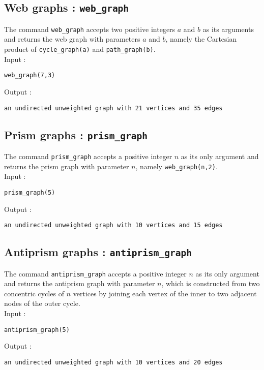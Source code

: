 \documentclass[a4paper,11pt]{article}
\begin{document}
\subsection{Web graphs : {\tt web\_graph}}

The command {\tt web\_graph} accepts two positive integers $ a $ and $ b $ as its arguments and returns the web graph with parameters $ a $ and $ b $, namely the Cartesian product of {\tt cycle\_graph(a)} and {\tt path\_graph(b)}.\\
Input :
\begin{center}
  \tt web\_graph(7,3)
\end{center}
Output :
\begin{center}
  \tt an undirected unweighted graph with 21 vertices and 35 edges
\end{center}

\subsection{Prism graphs : {\tt prism\_graph}}

The command {\tt prism\_graph} accepts a positive integer $ n $ as its only argument and returns the prism graph with parameter $ n $, namely {\tt web\_graph(n,2)}.\\
Input :
\begin{center}
  \tt prism\_graph(5)
\end{center}
Output :
\begin{center}
  \tt an undirected unweighted graph with 10 vertices and 15 edges
\end{center}

\subsection{Antiprism graphs : {\tt antiprism\_graph}}

The command {\tt antiprism\_graph} accepts a positive integer $ n $ as its only argument and returns the antiprism graph with parameter $ n $, which is constructed from two concentric cycles of $ n $ vertices by joining each vertex of the inner to two adjacent nodes of the outer cycle.\\
Input :
\begin{center}
  \tt antiprism\_graph(5)
\end{center}
Output :
\begin{center}
  \tt an undirected unweighted graph with 10 vertices and 20 edges
\end{center}
\end{document}
